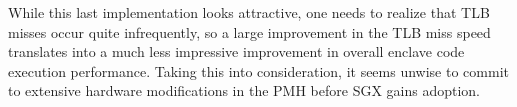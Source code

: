While this last implementation looks attractive, one needs to realize that
TLB misses occur quite infrequently, so a large improvement in the TLB miss
speed translates into a much less impressive improvement in overall enclave
code execution performance. Taking this into consideration, it seems unwise to
commit to extensive hardware modifications in the PMH before SGX gains
adoption.



